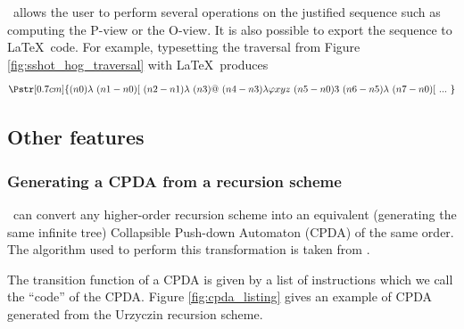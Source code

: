 \toolname\ allows the user to perform several operations on the justified sequence such as computing the P-view or the O-view. It is also possible to export the sequence to \LaTeX\ code. For example, typesetting the traversal from Figure \ref{fig:sshot_hog_traversal} with \LaTeX\ produces
$$\Pstr[0.7cm]{(n0){\lambda }\ (n1-n0){[}\ (n2-n1){\lambda }\ (n3){@}\ (n4-n3){\lambda \varphi x y z}\ (n5-n0){3}\ (n6-n5){\lambda }\ (n7-n0){[}\ {...}\ }$$

\subsection{Other features}




\subsubsection{Generating a CPDA from a recursion scheme}
\toolname\ can  convert any higher-order recursion scheme into an equivalent (\ie generating the same infinite tree) Collapsible Push-down Automaton (CPDA) of the same order. The algorithm used to perform this transformation is taken from \cite{hague-sto07}.

The transition function of a CPDA is given by a list of instructions which we call the ``code'' of the CPDA. Figure \ref{fig:cpda_listing} gives an example of CPDA generated from the Urzyczin recursion scheme.

